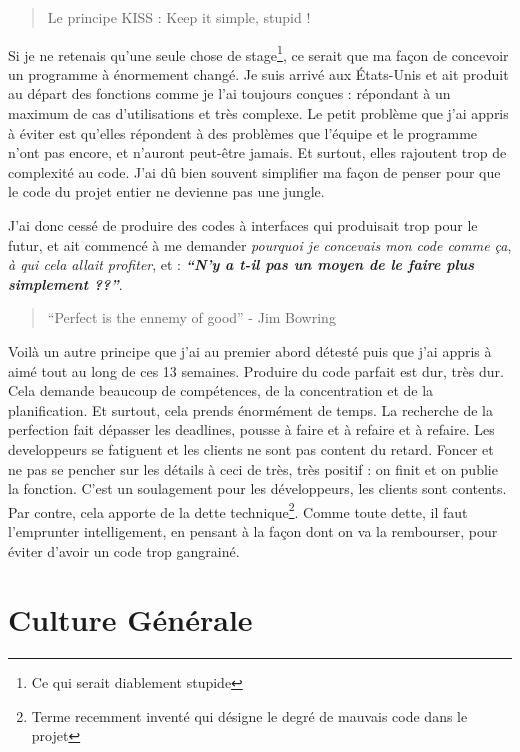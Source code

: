 \begin{quote}Le principe KISS : Keep it simple, stupid !\end{quote}

Si je ne retenais qu'une seule chose de stage\footnote{Ce qui serait diablement stupide}, ce serait que ma façon de concevoir un programme à énormement changé. Je suis arrivé aux États-Unis et ait produit au départ des fonctions comme je l'ai toujours conçues : répondant à un maximum de cas d'utilisations et très complexe. Le petit problème que j'ai appris à éviter est qu'elles répondent à des problèmes que l'équipe et le programme n'ont pas encore, et n'auront peut-être jamais. Et surtout, elles rajoutent trop de complexité au code. J'ai dû bien souvent simplifier ma façon de penser pour que le code du projet entier ne devienne pas une jungle.

J'ai donc cessé de produire des codes à interfaces qui produisait trop pour le futur, et ait commencé à me demander \emph{pourquoi je concevais mon code comme ça}, \emph{à qui cela allait profiter}, et : \emph{\textbf{``N'y a t-il pas un moyen de le faire plus simplement ??''}}.

\begin{quote}
``Perfect is the ennemy of good'' - Jim Bowring
\end{quote}

Voilà un autre principe que j'ai au premier abord détesté puis que j'ai appris à aimé tout au long de ces 13 semaines. Produire du code parfait est dur, très dur. Cela demande beaucoup de compétences, de la concentration et de la planification. Et surtout, cela prends énormément de temps. La recherche de la perfection fait dépasser les deadlines, pousse à faire et à refaire et à refaire. Les developpeurs se fatiguent et les clients ne sont pas content du retard. Foncer et ne pas se pencher sur les détails à ceci de très, très positif : on finit et on publie la fonction. C'est un soulagement pour les développeurs, les clients sont contents. Par contre, cela apporte de la dette technique\footnote{Terme recemment inventé qui désigne le degré de mauvais code dans le projet}. Comme toute dette, il faut l'emprunter intelligement, en pensant à la façon dont on va la rembourser, pour éviter d'avoir un code trop gangrainé.

\section{Culture Générale}
